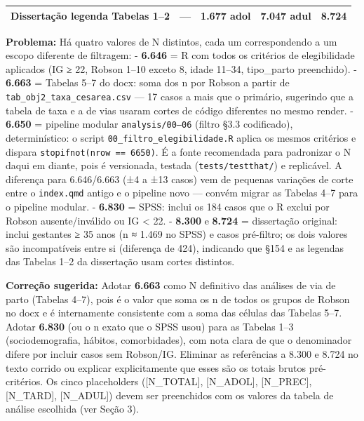 \documentclass[
]{article}
\begin{document}
\begin{longtable}[]{@{}lllll@{}}
\begin{minipage}[t]{0.17\columnwidth}\raggedright
Dissertação legenda Tabelas 1--2\strut
\end{minipage} & \begin{minipage}[t]{0.17\columnwidth}\raggedright
---\strut
\end{minipage} & \begin{minipage}[t]{0.17\columnwidth}\raggedright
1.677 adol\strut
\end{minipage} & \begin{minipage}[t]{0.17\columnwidth}\raggedright
7.047 adul\strut
\end{minipage} & \begin{minipage}[t]{0.17\columnwidth}\raggedright
\textbf{8.724}\strut
\end{minipage}\tabularnewline
\bottomrule
\end{longtable}

\textbf{Problema:} Há quatro valores de N distintos, cada um
correspondendo a um escopo diferente de filtragem: - \textbf{6.646} = R
com todos os critérios de elegibilidade aplicados (IG ≥ 22, Robson 1--10
exceto 8, idade 11--34, tipo\_parto preenchido). - \textbf{6.663} =
Tabelas 5--7 do docx: soma dos n por Robson a partir de
\texttt{tab\_obj2\_taxa\_cesarea.csv} --- 17 casos a mais que o
primário, sugerindo que a tabela de taxa e a de vias usaram cortes de
código diferentes no mesmo render. - \textbf{6.650} = pipeline modular
\texttt{analysis/00–06} (filtro §3.3 codificado), determinístico: o
script \texttt{00\_filtro\_elegibilidade.R} aplica os mesmos critérios e
dispara \texttt{stopifnot(nrow\ ==\ 6650)}. É a fonte recomendada para
padronizar o N daqui em diante, pois é versionada, testada
(\texttt{tests/testthat/}) e replicável. A diferença para 6.646/6.663
(±4 a ±13 casos) vem de pequenas variações de corte entre o
\texttt{index.qmd} antigo e o pipeline novo --- convém migrar as Tabelas
4--7 para o pipeline modular. - \textbf{6.830} = SPSS: inclui os 184
casos que o R exclui por Robson ausente/inválido ou IG \textless{} 22. -
\textbf{8.300} e \textbf{8.724} = dissertação original: inclui gestantes
≥ 35 anos (n ≈ 1.469 no SPSS) e casos pré-filtro; os dois valores são
incompatíveis entre si (diferença de 424), indicando que §154 e as
legendas das Tabelas 1--2 da dissertação usam cortes distintos.

\textbf{Correção sugerida:} Adotar \textbf{6.663} como N definitivo das
análises de via de parto (Tabelas 4--7), pois é o valor que soma os n de
todos os grupos de Robson no docx e é internamente consistente com a
soma das células das Tabelas 5--7. Adotar \textbf{6.830} (ou o n exato
que o SPSS usou) para as Tabelas 1--3 (sociodemografia, hábitos,
comorbidades), com nota clara de que o denominador difere por incluir
casos sem Robson/IG. Eliminar as referências a 8.300 e 8.724 no texto
corrido ou explicar explicitamente que esses são os totais brutos
pré-critérios. Os cinco placeholders ({[}N\_TOTAL{]}, {[}N\_ADOL{]},
{[}N\_PREC{]}, {[}N\_TARD{]}, {[}N\_ADUL{]}) devem ser preenchidos com
os valores da tabela de análise escolhida (ver Seção 3).
\end{document}
